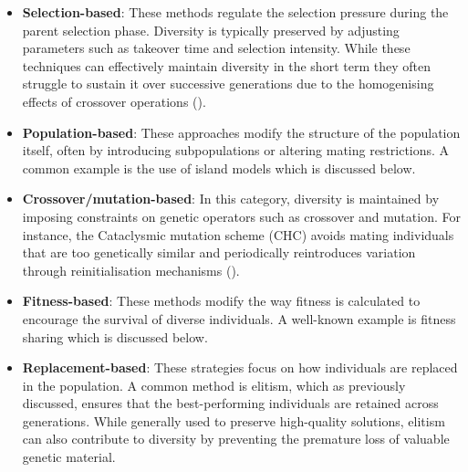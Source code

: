 \begin{itemize}
	\item \textbf{Selection-based}: These methods regulate the selection pressure during the parent selection phase. Diversity is typically preserved by adjusting parameters such as takeover time and selection intensity. While these techniques can effectively maintain diversity in the short term they often struggle to sustain it over successive generations due to the homogenising effects of crossover operations (\cite{blickle1996comparison}).
	\item \textbf{Population-based}: These approaches modify the structure of the population itself, often by introducing subpopulations or altering mating restrictions. A common example is the use of island models which is discussed below.
	\item \textbf{Crossover/mutation-based}: In this category, diversity is maintained by imposing constraints on genetic operators such as crossover and mutation. For instance, the Cataclysmic mutation scheme (CHC) avoids mating individuals that are too genetically similar and periodically reintroduces variation through reinitialisation mechanisms (\cite{segura2016importance}).
	\item \textbf{Fitness-based}: These methods modify the way fitness is calculated to encourage the survival of diverse individuals. A well-known example is fitness sharing which is discussed below.
	\item \textbf{Replacement-based}: These strategies focus on how individuals are replaced in the population. A common method is elitism, which as previously discussed, ensures that the best-performing individuals are retained across generations. While generally used to preserve high-quality solutions, elitism can also contribute to diversity by preventing the premature loss of valuable genetic material.
\end{itemize}

